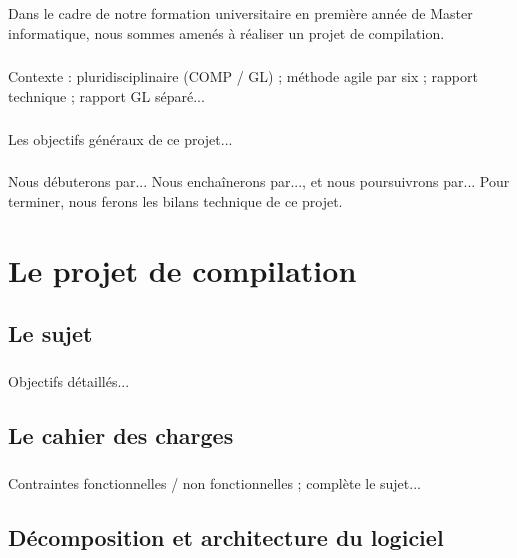 \documentclass[a4paper,12pt]{report}
\begin{document}
\paragraph{}
Dans le cadre de notre formation universitaire en première année de Master informatique, nous sommes amenés à réaliser un projet de compilation.
\paragraph{}
Contexte : pluridisciplinaire (COMP / GL) ; méthode agile par six ; rapport technique ; rapport GL séparé...
\paragraph{}
Les objectifs généraux de ce projet...
\paragraph{}
Nous débuterons par... Nous enchaînerons par..., et nous poursuivrons par... Pour terminer, nous ferons les bilans technique de ce projet.

\chapter{Le projet de compilation}
\section{Le sujet}
\paragraph{}
Objectifs détaillés...
\section{Le cahier des charges}
\paragraph{}
Contraintes fonctionnelles / non fonctionnelles ; complète le sujet...
\section{Décomposition et architecture du logiciel}
\end{document}
